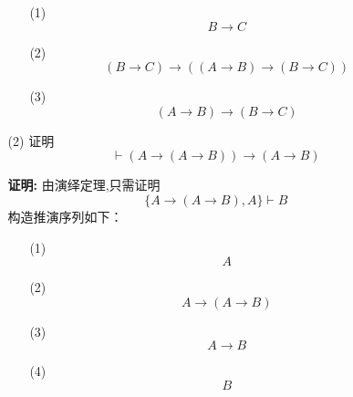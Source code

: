 \documentclass[11pt,oneside,a4paper]{article}
\begin{document}
\begin{itemize}
\begin{itemize}
\begin{itemize}
                \item[(1)]  
                            \begin{equation*}
                                B \to C                      \tag*{$\varGamma$}
                            \end{equation*}
                \item[(2)] 
                            \begin{equation*}
                               (B \to C) \to ((A \to B) \to (B \to C))  \tag*{L2}
                            \end{equation*}
                \item[(3)]
                            \begin{equation*}
                                (A \to B) \to (B \to C)      \tag*{MP(1,2)}
                            \end{equation*}
            \end{itemize}
            \item[(2)] 证明\[ \vdash (A \to (A \to B)) \to (A \to B)\] \par
            \textbf{证明:} \quad 由演绎定理,只需证明
                        \begin{equation*}
                            \{ A \to (A \to B),A \} \vdash B
                        \end{equation*}
            构造推演序列如下：            
            \begin{itemize}    
                \item[(1)] \begin{equation*}
                             A  \tag*{$\varGamma$}
                            \end{equation*}
                \item[(2)] 
                           \begin{equation*}
                            A \to (A \to B) \tag*{$\varGamma$}
                           \end{equation*}
                \item[(3)]
                           \begin{equation*}
                            A \to B \tag*{MP(1,2)}
                           \end{equation*}  
                \item[(4)]
                           \begin{equation*}
                               B \tag*{MP(1,3)}
                           \end{equation*}  
            \end{itemize}
            

\end{itemize}
\end{itemize}
\end{document}
